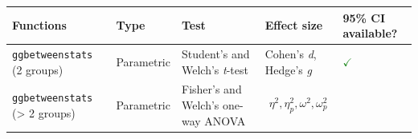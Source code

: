 \documentclass[
]{article}
\begin{document}
\begin{longtable}[]{@{}lllll@{}}
\toprule
\begin{minipage}[b]{0.20\columnwidth}\raggedright
Functions\strut
\end{minipage} & \begin{minipage}[b]{0.16\columnwidth}\raggedright
Type\strut
\end{minipage} & \begin{minipage}[b]{0.31\columnwidth}\raggedright
Test\strut
\end{minipage} & \begin{minipage}[b]{0.12\columnwidth}\raggedright
Effect size\strut
\end{minipage} & \begin{minipage}[b]{0.07\columnwidth}\raggedright
95\% CI available?\strut
\end{minipage}\tabularnewline
\midrule
\endhead
\begin{minipage}[t]{0.20\columnwidth}\raggedright
\texttt{ggbetweenstats} (2 groups)\strut
\end{minipage} & \begin{minipage}[t]{0.16\columnwidth}\raggedright
Parametric\strut
\end{minipage} & \begin{minipage}[t]{0.31\columnwidth}\raggedright
Student's and Welch's \emph{t}-test\strut
\end{minipage} & \begin{minipage}[t]{0.12\columnwidth}\raggedright
Cohen's \emph{d}, Hedge's \emph{g}\strut
\end{minipage} & \begin{minipage}[t]{0.07\columnwidth}\raggedright
\textcolor{ForestGreen}{$\checkmark$}\strut
\end{minipage}\tabularnewline
\begin{minipage}[t]{0.20\columnwidth}\raggedright
\texttt{ggbetweenstats} (\textgreater{} 2 groups)\strut
\end{minipage} & \begin{minipage}[t]{0.16\columnwidth}\raggedright
Parametric\strut
\end{minipage} & \begin{minipage}[t]{0.31\columnwidth}\raggedright
Fisher's and Welch's one-way ANOVA\strut
\end{minipage} & \begin{minipage}[t]{0.12\columnwidth}\raggedright
\[\eta^2, \eta^2_p, \omega^2, \omega^2_p\]\strut
\end{minipage} & \begin{minipage}[t]{0.07\columnwidth}\raggedright

\end{minipage}
\end{longtable}
\end{document}
